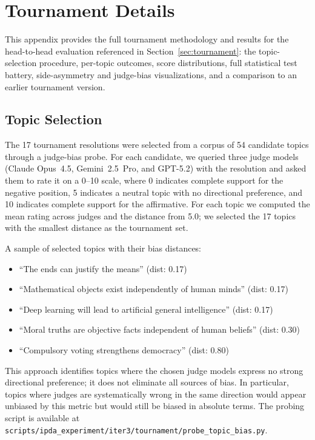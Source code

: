 \section{Tournament Details}
\label{app:tournament_details}

This appendix provides the full tournament methodology and results for the
head-to-head evaluation referenced in Section~\ref{sec:tournament}: the
topic-selection procedure, per-topic outcomes, score distributions, full
statistical test battery, side-asymmetry and judge-bias visualizations,
and a comparison to an earlier tournament version.

\subsection{Topic Selection}
\label{app:topic_selection}

The 17 tournament resolutions were selected from a corpus of 54 candidate
topics through a judge-bias probe. For each candidate, we queried three
judge models (Claude Opus~4.5, Gemini~2.5~Pro, and GPT-5.2) with the
resolution and asked them to rate it on a 0--10 scale, where 0 indicates
complete support for the negative position, 5 indicates a neutral topic
with no directional preference, and 10 indicates complete support for the
affirmative. For each topic we computed the mean rating across judges and
the distance from 5.0; we selected the 17 topics with the smallest distance
as the tournament set.

A sample of selected topics with their bias distances:
\begin{itemize}
    \item ``The ends can justify the means'' (dist: 0.17)
    \item ``Mathematical objects exist independently of human minds'' (dist: 0.17)
    \item ``Deep learning will lead to artificial general intelligence'' (dist: 0.17)
    \item ``Moral truths are objective facts independent of human beliefs'' (dist: 0.30)
    \item ``Compulsory voting strengthens democracy'' (dist: 0.80)
\end{itemize}

This approach identifies topics where the chosen judge models express no
strong directional preference; it does not eliminate all sources of bias.
In particular, topics where judges are systematically wrong in the same
direction would appear unbiased by this metric but would still be biased
in absolute terms. The probing script is available at
\texttt{scripts/ipda\_experiment/iter3/tournament/probe\_topic\_bias.py}.

